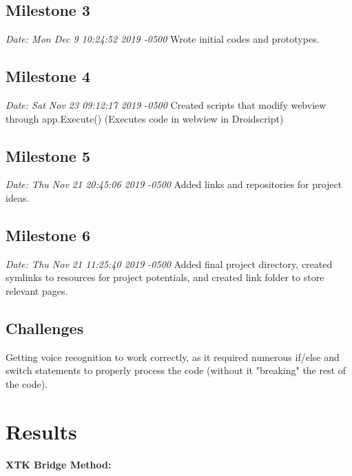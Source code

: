 \documentclass[sigconf]{acmart}
\begin{document}
\subsection{Milestone 3}

\textit{Date:   Mon Dec 9 10:24:52 2019 -0500}\newline
Wrote initial codes and prototypes.

\subsection{Milestone 4}

\textit{Date:   Sat Nov 23 09:12:17 2019 -0500}\newline
Created scripts that modify webview through app.Execute() (Executes code in webview in Droidscript)

\subsection{Milestone 5}

\textit{Date:   Thu Nov 21 20:45:06 2019 -0500}\newline
Added links and repositories for project ideas.

\subsection{Milestone 6}
\textit{Date:   Thu Nov 21 11:25:40 2019 -0500}\newline
Added final project directory, created symlinks to resources for project potentials, and created link folder to store relevant pages.

\subsection{Challenges}
Getting voice recognition to work correctly, as it required numerous if/else and switch statements to properly process the code (without it "breaking" the rest of the code).

\section{Results}

\vspace{0.09 cm}

\textbf{XTK Bridge Method:}
\end{document}
